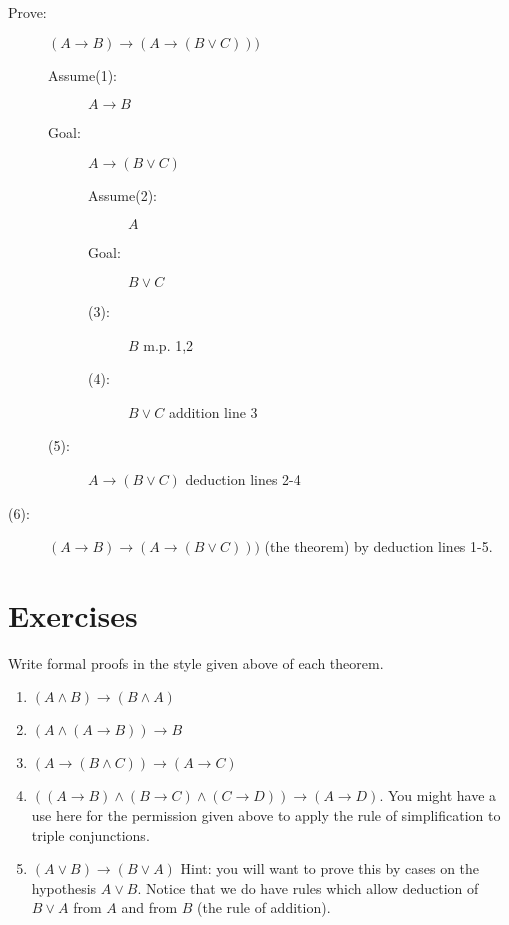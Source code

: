 \documentclass[12pt]{article}
\begin{document}
\begin{description}

\item[Prove:]  $(A \rightarrow B) \rightarrow (A \rightarrow( B \vee C)))$

\begin{description}

\item[Assume(1):]  $A \rightarrow B$

\item[Goal:]  $A \rightarrow (B \vee C)$

\begin{description}

\item[Assume(2):]  $A$

\item[Goal:]  $B \vee C$

\item[(3):]  $B$  m.p. 1,2

\item[(4):]  $B \vee C$ addition line 3

\end{description}

\item[(5):]  $A \rightarrow (B \vee C)$  deduction lines 2-4

\end{description}

\item[(6):]  $(A \rightarrow B) \rightarrow (A \rightarrow( B \vee C)))$ (the theorem) by deduction lines 1-5.

\end{description}

\newpage

\section{Exercises}

Write formal proofs in the style given above of each theorem.

\begin{enumerate}

\item $(A \wedge B) \rightarrow (B \wedge A)$

\item $(A \wedge (A \rightarrow B)) \rightarrow B$

\item $(A \rightarrow (B \wedge C)) \rightarrow (A \rightarrow C)$

\item $((A \rightarrow B) \wedge (B \rightarrow C) \wedge (C \rightarrow D)) \rightarrow (A \rightarrow D)$.  You might have a use here for the permission given above to apply the rule of simplification to triple conjunctions.

\item $(A \vee B) \rightarrow (B \vee A)$  Hint: you will want to prove this by cases on the hypothesis $A \vee B$.  Notice that we do have rules which allow deduction
of $B \vee A$ from $A$ and from $B$ (the rule of addition).

\end{enumerate}
\end{document}
